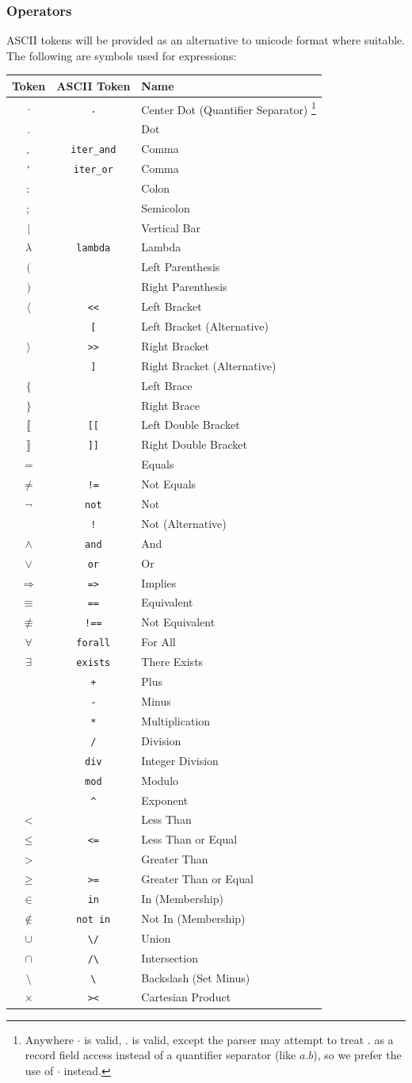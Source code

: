 \documentclass{article}
\newcommand{\lexentry}[3]{%
  \ensuremath{#1} & \texttt{#2} & #3\\%
}
\begin{document}
\subsubsection{Operators}
ASCII tokens will be provided as an alternative to unicode format where suitable. The following are symbols used for expressions:
\begin{center}
\begin{longtable}{c c l}
    \textbf{Token} & \textbf{ASCII Token} & \textbf{Name} \\
    \endhead
    \lexentry{\cdot}{.}{Center Dot (Quantifier Separator) \footnote{Anywhere $\cdot$ is valid, $.$ is valid, except the parser may attempt to treat $.$ as a record field access instead of a quantifier separator (like $a.b$), so we prefer the use of $\cdot$ instead.}}
    \lexentry{.}{}{Dot}
    \lexentry{,}{iter\_and}{Comma}
    \lexentry{`}{iter\_or}{Comma}
    \lexentry{:}{}{Colon}
    \lexentry{;}{}{Semicolon}
    \lexentry{|}{}{Vertical Bar}
    \lexentry{\lambda}{lambda}{Lambda}
    \lexentry{(}{}{Left Parenthesis}
    \lexentry{)}{}{Right Parenthesis}
    \lexentry{\langle}{<{}<}{Left Bracket}
    \lexentry{}{[}{Left Bracket (Alternative)}
    \lexentry{\rangle}{>{}>}{Right Bracket}
    \lexentry{}{]}{Right Bracket (Alternative)}
    \lexentry{\{}{}{Left Brace}
    \lexentry{\}}{}{Right Brace}
    \lexentry{\llbracket}{[[}{Left Double Bracket}
    \lexentry{\rrbracket}{]]}{Right Double Bracket}
    \lexentry{=}{}{Equals}
    \lexentry{\neq}{!=}{Not Equals}
    \lexentry{\lnot}{not}{Not}
    \lexentry{}{!}{Not (Alternative)}
    \lexentry{\land}{and}{And}
    \lexentry{\lor}{or}{Or}
    \lexentry{\Rightarrow}{=>}{Implies}
    \lexentry{\equiv}{==}{Equivalent}
    \lexentry{\not\equiv}{!==}{Not Equivalent}
    \lexentry{\forall}{forall}{For All}
    \lexentry{\exists}{exists}{There Exists}
    \lexentry{}{+}{Plus}
    \lexentry{}{-}{Minus}
    \lexentry{}{*}{Multiplication}
    \lexentry{}{/}{Division}
    \lexentry{}{div}{Integer Division}
    \lexentry{}{mod}{Modulo}
    \lexentry{}{\^}{Exponent}
    \lexentry{<}{}{Less Than}
    \lexentry{\leq}{<=}{Less Than or Equal}
    \lexentry{>}{}{Greater Than}
    \lexentry{\geq}{>=}{Greater Than or Equal}
    \lexentry{\in}{in}{In (Membership)}
    \lexentry{\not\in}{not in}{Not In (Membership)}
    \lexentry{\cup}{\textbackslash/}{Union}
    \lexentry{\cap}{/\textbackslash}{Intersection}
    \lexentry{\setminus}{\textbackslash}{Backslash (Set Minus)}
    \lexentry{\times}{><}{Cartesian Product}

\end{longtable}
\end{center}
\end{document}
